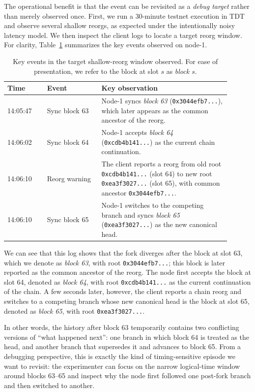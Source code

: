 The operational benefit is that the event can be revisited as a \emph{debug target} rather than merely observed once.
First, we run a 30-minute testnet execution in TDT and observe several shallow reorgs, as expected under the intentionally noisy latency model.
We then inspect the client logs to locate a target reorg window. For clarity, Table~\ref{tab:reorg_window_timeline} summarizes the key events observed on node-1.

\begin{table}[t]
\centering
\scriptsize
\setlength{\tabcolsep}{4pt}
\caption{Key events in the target shallow-reorg window observed. For ease of presentation, we refer to the block at slot $s$ as \emph{block $s$}.}
\label{tab:reorg_window_timeline}
\begin{tabular}{p{0.16\linewidth}p{0.22\linewidth}p{0.52\linewidth}}
\toprule
\textbf{Time} & \textbf{Event} & \textbf{Key observation} \\
\midrule
14:05:47 & Sync block 63 & Node-1 syncs \emph{block 63} (\texttt{0x3044efb7...}), which later appears as the common ancestor of the reorg. \\
14:06:02 & Sync block 64 & Node-1 accepts \emph{block 64} (\texttt{0xcdb4b141...}) as the current chain continuation. \\
14:06:10 & Reorg warning & The client reports a reorg from old root \texttt{0xcdb4b141...} (slot 64) to new root \texttt{0xea3f3027...} (slot 65), with common ancestor \texttt{0x3044efb7...}. \\
14:06:10 & Sync block 65 & Node-1 switches to the competing branch and syncs \emph{block 65} (\texttt{0xea3f3027...}) as the new canonical head. \\
\bottomrule
\end{tabular}
\end{table}

We can see that this log shows that the fork diverges after the block at slot 63, which we denote as \emph{block 63}, with root \texttt{0x3044efb7...}; this block is later reported as the common ancestor of the reorg. The node first accepts the block at slot 64, denoted as \emph{block 64}, with root \texttt{0xcdb4b141...} as the current continuation of the chain. A few seconds later, however, the client reports a chain reorg and switches to a competing branch whose new canonical head is the block at slot 65, denoted as \emph{block 65}, with root \texttt{0xea3f3027...}.

In other words, the history after block 63 temporarily contains two conflicting versions of ``what happened next'': one branch in which block 64 is treated as the head, and another branch that supersedes it and advances to block 65. From a debugging perspective, this is exactly the kind of timing-sensitive episode we want to revisit: the experimenter can focus on the narrow logical-time window around blocks 63--65 and inspect why the node first followed one post-fork branch and then switched to another.

